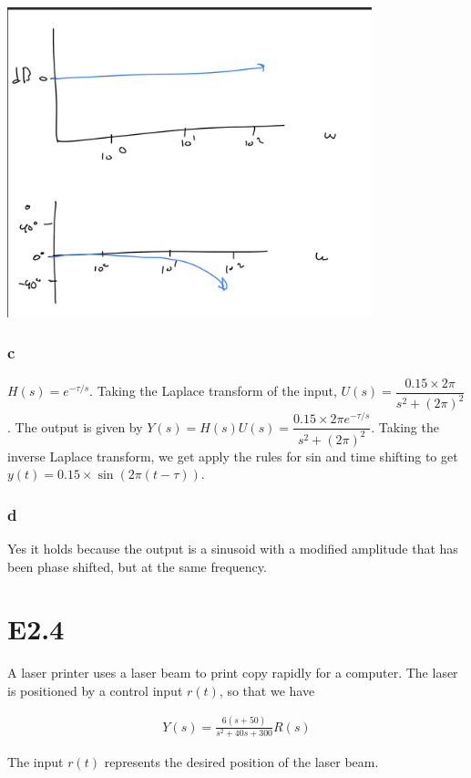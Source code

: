 \documentclass[11pt]{article}
\begin{document}
\includegraphics[width=300pt]{a2_q3.png}

\subsubsection{c}

$H(s) = e^{-\tau / s}$. Taking the Laplace transform of the input, $U(s) = \dfrac{0.15 \times 2 \pi}{s^2 + (2\pi)^2}$. The output is given by $Y(s) = H(s) U(s) = \dfrac{0.15 \times 2 \pi e^{-\tau / s}}{s^2 + (2\pi)^2}$. Taking the inverse Laplace transform, we get apply the rules for sin and time shifting to get $y(t) = 0.15 \times \sin (2\pi (t - \tau))$.

\subsubsection{d}

Yes it holds because the output is a sinusoid with a modified amplitude that has been phase shifted, but at the same frequency.

\section{E2.4}

A laser printer uses a laser beam to print copy rapidly for a computer. The laser is positioned by a control input \( r(t) \), so that we have

\begin{align*}
Y(s) = \frac{6(s + 50)}{s^2 + 40s + 300} R(s)
\end{align*}

The input $r(t)$ represents the desired position of the laser beam.
\end{document}
